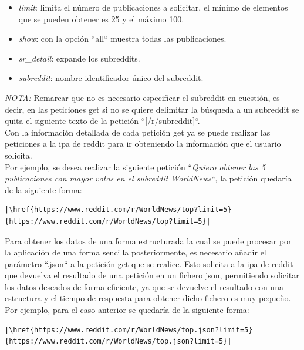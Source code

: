 \documentclass[../../main.tex]{subfiles}
\begin{document}
\begin{itemize}
\begin{itemize}
\begin{itemize}
            \item  \textit{limit}: limita el número de publicaciones a solicitar, el mínimo de elementos que se pueden obtener es 25 y el máximo 100.
            
            \item  \textit{show}: con la opción ``all`` muestra todas las publicaciones.
            
            \item  \textit{sr\_detail}: expande los \glspl{subreddit}.
            
            \item  \textit{subreddit}: nombre identificador único del \gls{subreddit}.
        \end{itemize}
    \end{itemize}
    
\end{itemize}

\textit{NOTA: } Remarcar que no es necesario especificar el \gls{subreddit} en cuestión, es decir, en las peticiones \gls{get} si no se quiere delimitar la búsqueda a un \gls{subreddit} se quita el siguiente texto de la petición ``[/r/subreddit]``. \\

Con la información detallada de cada petición \gls{get} ya se puede realizar las peticiones a la \gls{ipa} de \Gls{reddit} para ir obteniendo la información que el usuario solicita.\\
Por ejemplo, se desea realizar la siguiente petición ``\textit{Quiero obtener las 5 publicaciones con mayor votos en el subreddit WorldNews}``, la petición quedaría de la siguiente forma:
\begin{lstlisting}[escapechar=|]
|\href{https://www.reddit.com/r/WorldNews/top?limit=5}{https://www.reddit.com/r/WorldNews/top?limit=5}|
\end{lstlisting}

\vskip 0.2in

Para obtener los datos de una forma estructurada la cual se puede procesar por la aplicación de una forma sencilla posteriormente, es necesario añadir el parámetro ``.json`` a la petición \gls{get} que se realice. Esto solicita a la \gls{ipa} de \Gls{reddit} que devuelva el resultado de una petición en un fichero \gls{json}, permitiendo solicitar los datos deseados de forma eficiente, ya que se devuelve el resultado con una estructura y el tiempo de respuesta para obtener dicho fichero es muy pequeño. \\
Por ejemplo, para el caso anterior se quedaría de la siguiente forma:
\begin{lstlisting}[escapechar=|]
|\href{https://www.reddit.com/r/WorldNews/top.json?limit=5}{https://www.reddit.com/r/WorldNews/top.json?limit=5}|
\end{lstlisting}
\end{document}
